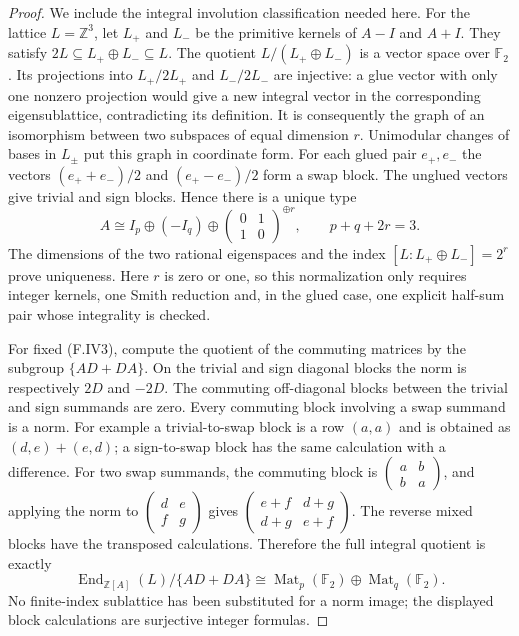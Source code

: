 \begin{proof}
We include the integral involution classification needed here.
For the lattice $L=\mathbb Z^3$, let $L_+$ and $L_-$ be the
primitive kernels of $A-I$ and $A+I$.  They satisfy
$2L\subseteq L_+\oplus L_-\subseteq L$.
The quotient $L/(L_+\oplus L_-)$ is a vector space over
$\mathbb F_2$.  Its projections into $L_+/2L_+$ and
$L_-/2L_-$ are injective: a glue vector with only one
nonzero projection would give a new integral vector in the
corresponding eigensublattice, contradicting its definition.
It is consequently the graph of an isomorphism between two
subspaces of equal dimension $r$.
Unimodular changes of bases in $L_\pm$ put this graph in
coordinate form.  For each glued pair $e_+,e_-$ the vectors
$(e_++e_-)/2$ and $(e_+-e_-)/2$ form a swap block.
The unglued vectors give trivial and sign blocks.  Hence
there is a unique type
\[
 A\cong I_p\oplus(-I_q)\oplus
 \begin{pmatrix}0&1\\1&0\end{pmatrix}^{\oplus r},
 \qquad p+q+2r=3.                                         \tag{F.IV3}
\]
The dimensions of the two rational eigenspaces and the
index $[L:L_+\oplus L_-]=2^r$ prove uniqueness.
Here $r$ is zero or one, so this normalization only requires
integer kernels, one Smith reduction and, in the glued case,
one explicit half-sum pair whose integrality is checked.

For fixed (F.IV3), compute the quotient of the commuting
matrices by the subgroup $\{AD+DA\}$.
On the trivial and sign diagonal blocks the norm is
respectively $2D$ and $-2D$.  The commuting off-diagonal
blocks between the trivial and sign summands are zero.
Every commuting block involving a swap summand is a norm.
For example a trivial-to-swap block is a row $(a,a)$ and
is obtained as $(d,e)+(e,d)$; a sign-to-swap block has the
same calculation with a difference.  For two swap summands,
the commuting block is
$\begin{pmatrix}a&b\\b&a\end{pmatrix}$, and applying the
norm to $\begin{pmatrix}d&e\\f&g\end{pmatrix}$ gives
$\begin{pmatrix}e+f&d+g\\d+g&e+f\end{pmatrix}$.
The reverse mixed blocks have the transposed calculations.
Therefore the full integral quotient is exactly
\[
 \operatorname{End}_{\mathbb Z[A]}(L)/\{AD+DA\}
 \cong \operatorname{Mat}_p(\mathbb F_2)
       \oplus\operatorname{Mat}_q(\mathbb F_2).             \tag{F.IV4}
\]
No finite-index sublattice has been substituted for a norm
image; the displayed block calculations are surjective
integer formulas.


\end{proof}
